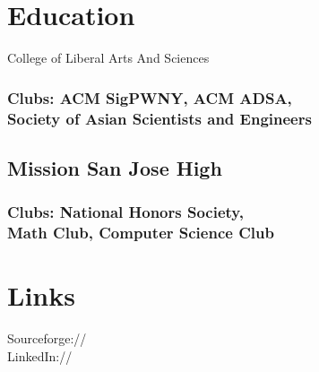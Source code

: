 \documentclass[]{deedy-resume-openfont}
\begin{document}
%
%
%
%



%
%

\begin{minipage}[t]{0.33\textwidth} 


\section{Education} 


College of Liberal Arts And Sciences
\subsubsection*{\quad Clubs: ACM SigPWNY, ACM ADSA, \\ \quad Society of Asian Scientists and Engineers}
\sectionsep

\subsection{Mission San Jose High}
\subsubsection*{\quad Clubs: National Honors Society, \\ \quad Math Club, Computer Science Club}
\sectionsep



\section{Links} 
Sourceforge:// \href{https://sourceforge.net/u/sayan121}{} \\
LinkedIn://  \href{https://www.linkedin.com/in/sayan-b}{} \\
\sectionsep


\end{minipage}
\end{document}

